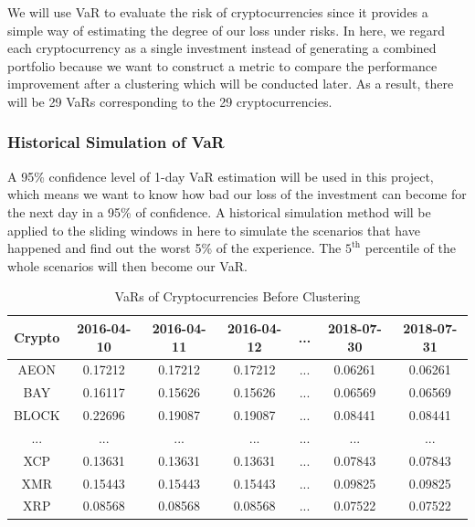 \documentclass[11pt]{article} %
\theoremstyle{plain}
\theoremstyle{definition}
\begin{document}
We will use VaR to evaluate the risk of cryptocurrencies since it provides a simple way of estimating the degree of our loss under risks. In here, we regard each cryptocurrency as a single investment instead of generating a combined portfolio because we want to construct a metric to compare the performance improvement after a clustering which will be conducted later. As a result, there will be 29 VaRs corresponding to the 29 cryptocurrencies.

\subsubsection{Historical Simulation of VaR}

A 95\% confidence level of 1-day VaR estimation will be used in this project, which means we want to know how bad our loss of the investment can become for the next day in a 95\% of confidence. A historical simulation method will be applied to the sliding windows in here to simulate the scenarios that have happened and find out the worst 5\% of the experience. The $5^{\mathrm{th}}$ percentile of the whole scenarios will then become our VaR.

{
  \begin{table}[ht]
    \centering
    \small
    \begin{tabular}{|c|c c c c c c|}
        \hline
        Crypto & 2016-04-10 & 2016-04-11 & 2016-04-12 & ... & 2018-07-30 & 2018-07-31 \\ [0.5ex]
        \hline
        AEON & 0.17212 & 0.17212 & 0.17212 & ... & 0.06261 & 0.06261 \\
        \hline
        BAY & 0.16117 & 0.15626 & 0.15626 & ... & 0.06569 & 0.06569 \\
        \hline
        BLOCK & 0.22696 & 0.19087 & 0.19087 & ... & 0.08441 & 0.08441 \\
        \hline
        ... & ... & ... & ... & ... & ... & ... \\
        \hline
        XCP & 0.13631 & 0.13631 & 0.13631 & ... & 0.07843 & 0.07843 \\
        \hline
        XMR & 0.15443 & 0.15443 & 0.15443 & ... & 0.09825 & 0.09825 \\
        \hline
        XRP & 0.08568 & 0.08568 & 0.08568 & ... & 0.07522 & 0.07522 \\
        \hline
    \end{tabular}
    \caption{VaRs of Cryptocurrencies Before Clustering}
    \label{table:varcryptobefore}
  \end{table}
}
\end{document}
